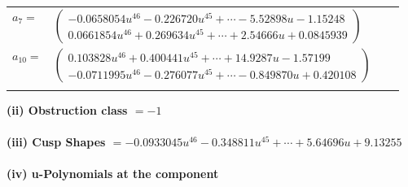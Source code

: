 \documentclass[1p]{elsarticle_modified}
\theoremstyle{definition}
\begin{document}
\begin{tabular}{m{7pt} m{180pt} m{7pt} m{180pt} }
\flushright $a_{7}=$&$\begin{pmatrix}-0.0658054 u^{46}-0.226720 u^{45}+\cdots-5.52898 u-1.15248\\0.0661854 u^{46}+0.269634 u^{45}+\cdots+2.54666 u+0.0845939\end{pmatrix}$ \\
\flushright $a_{10}=$&$\begin{pmatrix}0.103828 u^{46}+0.400441 u^{45}+\cdots+14.9287 u-1.57199\\-0.0711995 u^{46}-0.276077 u^{45}+\cdots-0.849870 u+0.420108\end{pmatrix}$\\&\end{tabular}
\flushleft \textbf{(ii) Obstruction class $= -1$}\\~\\
\flushleft \textbf{(iii) Cusp Shapes $= -0.0933045 u^{46}-0.348811 u^{45}+\cdots+5.64696 u+9.13255$}\\~\\
\newpage\renewcommand{\arraystretch}{1}
\flushleft \textbf{(iv) u-Polynomials at the component}\newline \\
\end{document}
